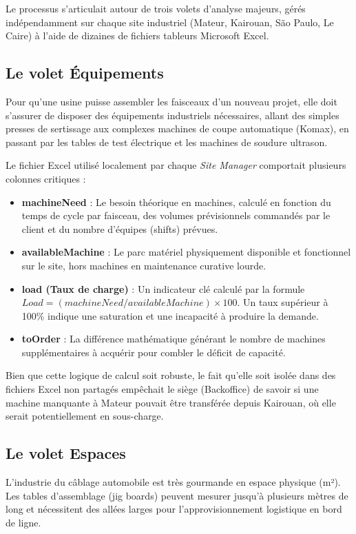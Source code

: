 Le processus s'articulait autour de trois volets d'analyse majeurs, gérés indépendamment sur chaque site industriel (Mateur, Kairouan, São Paulo, Le Caire) à l'aide de dizaines de fichiers tableurs Microsoft Excel.

\subsection{Le volet Équipements}
Pour qu'une usine puisse assembler les faisceaux d'un nouveau projet, elle doit s'assurer de disposer des équipements industriels nécessaires, allant des simples presses de sertissage aux complexes machines de coupe automatique (Komax), en passant par les tables de test électrique et les machines de soudure ultrason.

Le fichier Excel utilisé localement par chaque \textit{Site Manager} comportait plusieurs colonnes critiques :
\begin{itemize}
    \item \textbf{machineNeed} : Le besoin théorique en machines, calculé en fonction du temps de cycle par faisceau, des volumes prévisionnels commandés par le client et du nombre d'équipes (shifts) prévues.
    \item \textbf{availableMachine} : Le parc matériel physiquement disponible et fonctionnel sur le site, hors machines en maintenance curative lourde.
    \item \textbf{load (Taux de charge)} : Un indicateur clé calculé par la formule $Load = (machineNeed / availableMachine) \times 100$. Un taux supérieur à 100\% indique une saturation et une incapacité à produire la demande.
    \item \textbf{toOrder} : La différence mathématique générant le nombre de machines supplémentaires à acquérir pour combler le déficit de capacité.
\end{itemize}
Bien que cette logique de calcul soit robuste, le fait qu'elle soit isolée dans des fichiers Excel non partagés empêchait le siège (Backoffice) de savoir si une machine manquante à Mateur pouvait être transférée depuis Kairouan, où elle serait potentiellement en sous-charge.

\subsection{Le volet Espaces}
L'industrie du câblage automobile est très gourmande en espace physique (m²). Les tables d'assemblage (jig boards) peuvent mesurer jusqu'à plusieurs mètres de long et nécessitent des allées larges pour l'approvisionnement logistique en bord de ligne. 

